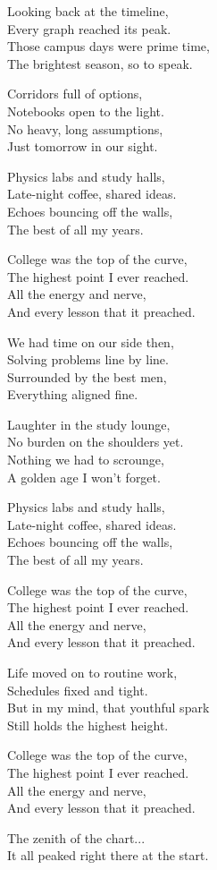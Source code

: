 \begin{lyrics}
Looking back at the timeline,\\
Every graph reached its peak.\\
Those campus days were prime time,\\
The brightest season, so to speak.

Corridors full of options,\\
Notebooks open to the light.\\
No heavy, long assumptions,\\
Just tomorrow in our sight.

Physics labs and study halls,\\
Late-night coffee, shared ideas.\\
Echoes bouncing off the walls,\\
The best of all my years.

College was the top of the curve,\\
The highest point I ever reached.\\
All the energy and nerve,\\
And every lesson that it preached.

We had time on our side then,\\
Solving problems line by line.\\
Surrounded by the best men,\\
Everything aligned fine.

Laughter in the study lounge,\\
No burden on the shoulders yet.\\
Nothing we had to scrounge,\\
A golden age I won't forget.

Physics labs and study halls,\\
Late-night coffee, shared ideas.\\
Echoes bouncing off the walls,\\
The best of all my years.

College was the top of the curve,\\
The highest point I ever reached.\\
All the energy and nerve,\\
And every lesson that it preached.

Life moved on to routine work,\\
Schedules fixed and tight.\\
But in my mind, that youthful spark\\
Still holds the highest height.

College was the top of the curve,\\
The highest point I ever reached.\\
All the energy and nerve,\\
And every lesson that it preached.

The zenith of the chart...\\
It all peaked right there at the start.
\end{lyrics}

